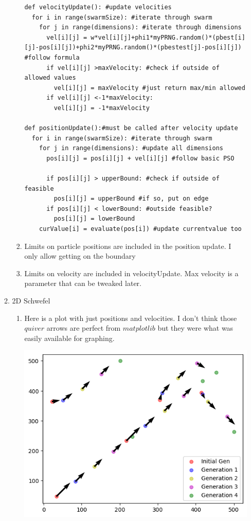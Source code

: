 \documentclass[11pt]{article}
\begin{document}
\begin{enumerate}
\begin{enumerate}
\begin{enumerate}
\begin{verbatim}
def velocityUpdate(): #update velocities
  for i in range(swarmSize): #iterate through swarm
    for j in range(dimensions): #iterate through dimensions
      vel[i][j] = w*vel[i][j]+phi1*myPRNG.random()*(pbest[i][j]-pos[i][j])+phi2*myPRNG.random()*(pbestest[j]-pos[i][j]) #follow formula
      if vel[i][j] >maxVelocity: #check if outside of allowed values
        vel[i][j] = maxVelocity #just return max/min allowed
      if vel[i][j] <-1*maxVelocity:
        vel[i][j] = -1*maxVelocity

def positionUpdate():#must be called after velocity update
  for i in range(swarmSize): #iterate through swarm
    for j in range(dimensions): #update all dimensions
      pos[i][j] = pos[i][j] + vel[i][j] #follow basic PSO

      if pos[i][j] > upperBound: #check if outside of feasible
        pos[i][j] = upperBound #if so, put on edge
      if pos[i][j] < lowerBound: #outside feasible?
        pos[i][j] = lowerBound
    curValue[i] = evaluate(pos[i]) #update currentvalue too
\end{verbatim}
\item Limits on particle positions are included in the position update.  I only allow getting on the boundary
\item Limits on velocity are included in velocityUpdate.  Max velocity is a parameter that can be tweaked later.
\end{enumerate}
\item 2D Schwefel
\begin{enumerate}
\item Here is a plot with just positions and velocities.  I don't think those $quiver$ arrows are perfect from $matplotlib$ but they were what was easily available for graphing.

\includegraphics{plot2.png}


\end{enumerate}
\end{enumerate}
\end{enumerate}
\end{document}
